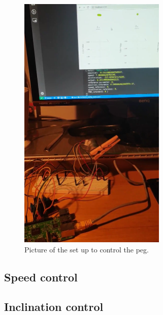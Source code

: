 \begin{figure}[H]
    \centering
    \includegraphics[width=7cm]{img/peg.png}
    \caption{Picture of the set up to control the peg.}
    \label{fig: MPU-6050}
\end{figure}


\subsection{Speed control}

\subsection{Inclination control}